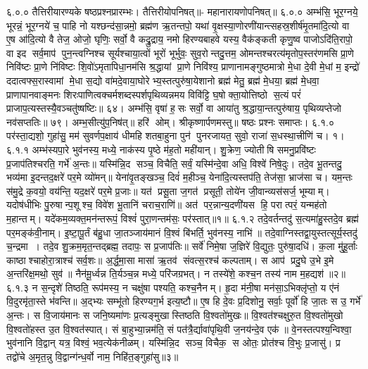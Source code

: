 \setcounter{anuvakam}{0}
६.०.०
तैत्तिरीयारण्यके षष्ठप्रश्नप्रारम्भः। तैत्तिरीयोपनिषत्॥- महानारायणोपनिषत्॥
६.०.०
अम्भ॑सि॒ भूर॒ग्नये॒ भूरन्नं॒ भूर॒ग्नये॑ च॒ पाहि नो यश्छन्द॑सा॒न्नमो॒ ब्रह्म॑ण ऋ॒तन्तपो॒ यथा॑ वृ॒क्षस्या॒णोरणी॑यान्त्सहस्र॒शीर्\mbox{}ष॑मृ॒तमा॑दि॒त्यो वा ए॒ष आ॑दि॒त्यो वै तेज॒ ओजो॒ घृणिः॒ सर्वो॒ वै कद्रु॒द्राय॒ नमो हिरण्यबाहवे यस्य॒ वैक॑ङ्कती कृणु॒ष्व पाजोऽदि॑ति॒रापो॒ वा इद सर्व॒माप॑ पुन॒न्त्वग्निश्च सूर्यश्चाया॒त्वों भूरों भूर्भुवः॒ सुव॒रोन्तदु॒त्तम॒ ओमन्तश्चरत्य॑मृतोप॒स्तर॑णमसि प्रा॒णे निवि॑ष्टः प्रा॒णे नि॑विष्टः  शि॒वो॑ऽमृतापिधा॒नम॑सि श्र॒द्धायां प्रा॒णे निवि॑श्य॒ प्राणानामङ्गुष्ठमात्रो मे॒धा दे॒वी मे॒धां म॒ इन्द्रो॑ ददात्वफ्स॒रास्वामां मे॒धा स॒द्यो वा॑मदे॒वाया॒घोरेभ्य॒स्तत्पुरु॑षा॒येशानो ब्रह्म॑ मेतु॒ ब्रह्म॑ मे॒धया॒ ब्रह्म॑ मे॒धवा॒ प्राणापानवाङ्मनः  शिरःपाणित्वक्चर्मशब्दस्पर्शपृथिव्यन्नमय विवि॑ट्टि घ॒षोक्ता॒योत्तिष्ठो स॒त्यं परं॑ प्राजाप॒त्यस्तस्यै॒वञ्चतु॑ष्षष्टिः॥ ६४। अम्भ॑सि॒ वृषा॑ ह॒सः सर्वो॒ वा आया॑तु श्र॒द्धाया॒न्तत्पुरु॑षाय॒ पृथिव्यप्तेजो नव॑सप्ततिः॥ ७९। अम्भ॒सीत्यु॑प॒निष॑त्॥ हरि॑ ओम्। श्रीकृष्णार्पणमस्तु॥ षष्ठः प्रश्नः समाप्तः।
६.१.०
पर॑स्ता॒द्यशो॒ गुहा॑सु॒ मम॑ सुवर्णप॒क्षाय॑ धीमहि शतबा॒हुना पुन॑ पुनरजायत॒ सुवो॒ राजा॑ स॒धस्था॒त्त्रीणि॑ च। १।
६.१.१
अम्भ॑स्यपा॒रे भुव॑नस्य॒ मध्ये॒ नाक॑स्य पृ॒ष्ठे म॑ह॒तो मही॑यान्। शु॒क्रेण॒ ज्योतीषि समनु॒प्रवि॑ष्टः प्र॒जाप॑तिश्चरति॒ गर्भे॑ अ॒न्तः॥ यस्मि॑न्नि॒द सञ्च॒ विचैति॒ सर्वं॒ यस्मि॑न्दे॒वा अधि॒ विश्वे॑ निषे॒दुः। तदे॒व भू॒तन्तदु॒ भव्य॑मा इ॒दन्तद॒क्षरे॑ पर॒मे व्यो॑मन्॥ येना॑वृ॒तङ्खञ्च॒ दिवं॑ म॒हीञ्च॒ येना॑दि॒त्यस्तप॑ति॒ तेज॑सा॒ भ्राज॑सा च। यम॒न्तः स॑मु॒द्रे क॒वयो॒ वय॑न्ति॒ यद॒क्षरे॑ पर॒मे प्र॒जाः॥ यत॑ प्रसू॒ता ज॒गत॑ प्रसूती॒ तोये॑न जी॒वान्व्यस॑सर्ज॒ भूम्याम्। यदोष॑धीभिः पु॒रुषान्प॒शूश्च॒ विवे॑श भू॒तानि॑ चराच॒राणि॑॥ अत॑ पर॒न्नान्य॒दणी॑यस हि॒ परात्परं॒ यन्मह॑तो म॒हान्तम्। यदे॑कम॒व्यक्त॒मन॑न्तरूपं॒  विश्वं॑ पुरा॒णन्तम॑सः॒ पर॑स्तात्॥१॥
६.१.२
तदे॒वर्तन्तदु॑ स॒त्यमा॑हु॒स्तदे॒व ब्रह्म॑ पर॒मङ्क॑वी॒नाम्। इ॒ष्टा॒पू॒र्तं ब॑हु॒धा जा॒तञ्जाय॑मानं  वि॒श्वं बि॑भर्ति॒ भुव॑नस्य॒ नाभि॑॥ तदे॒वाग्निस्तद्वा॒युस्तत्सूर्य॒स्तदु॑ च॒न्द्रमा। तदे॒व शु॒क्रम॒मृत॒न्तद्ब्रह्म॒ तदापः॒ स प्र॒जाप॑तिः॥ सर्वे॑ निमे॒षा ज॒ज्ञिरे॑ वि॒द्युतः॒ पुरु॑षा॒दधि॑। क॒ला मु॑हू॒र्ताः काष्ठाश्चाहोरा॒त्राश्च॑ सर्व॒शः॥ अ॒र्द्ध॒मा॒सा मासा॑ ऋ॒तव॑ संवत्स॒रश्च॑ कल्पताम्। स आप॑ प्रदु॒घे उ॒भे इ॒मे अ॒न्तरि॑क्ष॒मथो॒ सुव॑॥ नैन॑मू॒र्ध्वन्न ति॒र्यञ्च॒न्न मध्ये॒ परि॑जग्रभत्। न तस्ये॑शे॒ कश्च॒न तस्य॑ नाम म॒हद्यश॑॥२॥
६.१.३
न स॒न्दृशे॑ तिष्ठति॒ रूप॑मस्य॒ न चक्षु॑षा पश्यति॒ कश्च॒नैनम्। हृ॒दा म॑नी॒षा मन॑सा॒ऽभिक्लृ॑प्तो॒ य ए॑नं  वि॒दुरमृ॑ता॒स्ते भ॑वन्ति॥ अ॒द्भ्यः सम्भू॑तो हिरण्यग॒र्भ इत्य॒ष्टौ॥ ए॒ष हि दे॒वः प्र॒दिशोनु॒ सर्वाः॒ पूर्वो॑ हि जा॒तः स उ॒ गर्भे॑ अ॒न्तः। स वि॒जाय॑मानः स जनि॒ष्यमा॑णः प्र॒त्यङ्मुखास्तिष्ठति वि॒श्वतो॑मुखः॥ वि॒श्वत॑श्चक्षुरु॒त वि॒श्वतो॑मुखो वि॒श्वतो॑हस्त उ॒त वि॒श्वत॑स्पात्। सं बा॒हुभ्या॒न्नम॑ति॒ सं पत॑त्रै॒र्द्यावा॑पृथि॒वी ज॒नय॑न्दे॒व एक॑॥ वे॒नस्तत्पश्य॒न्विश्वा॒ भुव॑नानि वि॒द्वान् यत्र॒ विश्वं॒ भव॒त्येक॑नीळम्। यस्मि॑न्नि॒द सञ्च॒ विचैक॒ स ओतः॒ प्रोत॑श्च वि॒भुः प्र॒जासु॑। प्र तद्वो॑चे अ॒मृत॒न्नु वि॒द्वान्ग॑न्ध॒र्वो नाम॒ निहि॑त॒ङ्गुहा॑सु॥३॥

